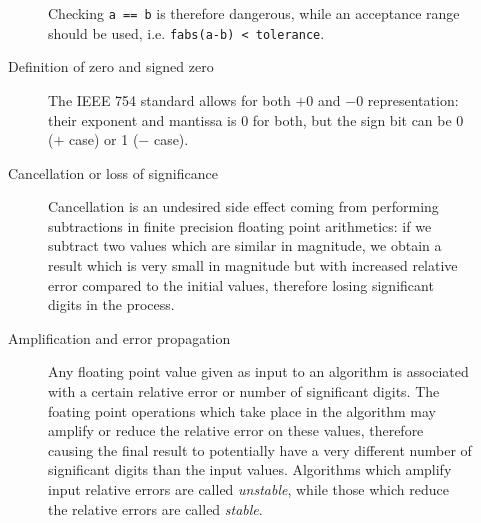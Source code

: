 \documentclass{article}
\begin{document}
\begin{description}
\begin{description}
			Checking \verb!a == b! is therefore dangerous, while an acceptance range should be used, i.e. \verb!fabs(a-b) < tolerance!.
			\item[Definition of zero and signed zero] The IEEE 754 standard allows for both $+0$ and $-0$ representation: their exponent and mantissa is $0$ for both, but the sign bit can be 0 ($+$ case) or 1 ($-$ case).
			\item[Cancellation or loss of significance] Cancellation is an undesired side effect coming from performing subtractions in finite precision floating point arithmetics: if we subtract two values which are similar in magnitude, we obtain a result which is very small in magnitude but with increased relative error compared to the initial values, therefore losing significant digits in the process.
			\item[Amplification and error propagation] Any floating point value given as input to an algorithm is associated with a certain relative error or number of significant digits. The foating point operations which take place in the algorithm may amplify or reduce the relative error on these values, therefore causing the final result to potentially have a very different number of significant digits than the input values. Algorithms which amplify input relative errors are called \emph{unstable}, while those which reduce the relative errors are called \emph{stable}.
		\end{description}
\end{description}
\end{document}
